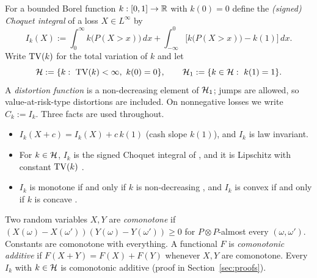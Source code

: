 For a bounded Borel function $k:[0,1]\to\mathbb R$ with $k(0)=0$ define the \emph{(signed) Choquet integral}
of a loss $X\in L^\infty$ by
\[
 I_k(X):=\int_0^\infty k\big(P(X>x)\big)\,dx+\int_{-\infty}^0\Big[k\big(P(X>x)\big)-k(1)\Big]\,dx .
\]
Write $\mathrm{TV}(k)$ for the total variation of $k$ and let
\[
 \Hset:=\{k:\ \TV(k)<\infty,\ k(0)=0\},\qquad \Hset_1:=\{k\in\Hset:\ k(1)=1\}.
\]
A \emph{distortion function} is a non-decreasing element of $\mathcal H_1$; jumps are allowed, so
value-at-risk-type distortions are included. On nonnegative losses we write $C_k:=I_k$. Three facts
are used throughout.

\begin{itemize}
\item $I_k(X+c)=I_k(X)+c\,k(1)$ (cash slope $k(1)$), and $I_k$ is law invariant.
\item For $k\in\mathcal H$, $I_k$ is the signed Choquet integral of \citet[Def.~1]{www2020}, and it is
  Lipschitz with constant $\mathrm{TV}(k)$ \citep{www2020}.
\item $I_k$ is monotone if and only if $k$ is non-decreasing \citep{www2020}, and $I_k$ is convex if and
  only if $k$ is concave \citep[Thm.~3]{www2020}.
\end{itemize}

Two random variables $X,Y$ are \emph{comonotone} if
$(X(\omega)-X(\omega'))(Y(\omega)-Y(\omega'))\ge0$ for $P\otimes P$-almost every $(\omega,\omega')$.
Constants are comonotone with everything. A functional $F$ is \emph{comonotonic additive} if
$F(X+Y)=F(X)+F(Y)$ whenever $X,Y$ are comonotone. Every $I_k$ with $k\in\mathcal H$ is comonotonic additive (proof in Section~\ref{sec:proofs}).
